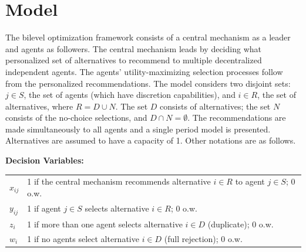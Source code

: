 \documentclass[11pt, letterpaper]{article}
\begin{document}
\section{Model} 
The bilevel optimization framework consists of a central mechanism as a leader  and agents as followers. The central mechanism leads by deciding what personalized set of alternatives to recommend to multiple decentralized independent agents.  The agents' utility-maximizing selection processes follow from the personalized recommendations. 
The model considers two disjoint sets: $j \in S$, the set of agents (which have discretion capabilities), and $i \in R$, the set of alternatives, where $R=D\cup N$. The set $D$ consists of alternatives; the set $N$ consists of the no-choice selections, and $D\cap N=\emptyset$.   The recommendations are made simultaneously to all agents and a single period model is presented. Alternatives are assumed to have a capacity of 1. Other notations are as follows.

   
\vspace{-.1in}
\begin{flushleft}
{\bf Decision Variables:}
\end{flushleft}
\vspace{-0.1in}
\begin{tabular}{l@{\quad}l}
$x_{ij}$ & 1 if the central mechanism recommends alternative $i\in R$ to agent $j \in S$; 0 o.w. \\ %
$y_{ij}$ & 1 if agent $j \in S$ selects alternative $i \in R$; 0 o.w. \\ %
$z_{i}$ & 1 if more than one agent selects alternative $i \in D$ (duplicate); 0 o.w.  \\ %
$w_{i}$ & 1 if no agents select alternative $i \in D$ (full rejection); 0 o.w. \\%
\end{tabular}
\vspace{-.1in}
\end{document}
